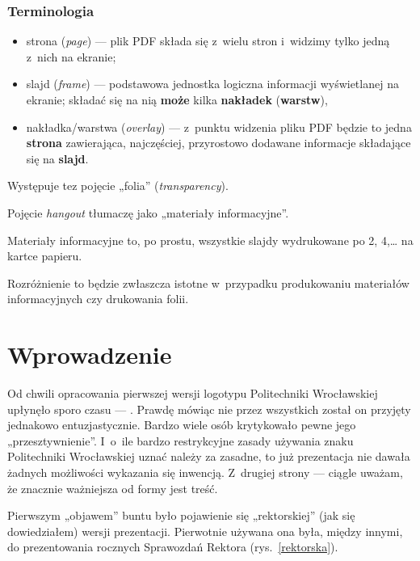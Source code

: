 \begin{frame}[fragile]
 \frametitle<presentation>{Terminologia}
 \begin{itemize}
  \item
        strona (\emph{page}) — plik PDF składa się z~wielu stron i~widzimy tylko jedną z~nich na ekranie;
  \item
        slajd (\emph{frame}) — podstawowa jednostka logiczna informacji wyświetlanej na ekranie; składać się na nią \textbf{może} kilka \textbf{nakładek} (\textbf{warstw}),
  \item
        nakładka/warstwa (\emph{overlay}) — z~punktu widzenia pliku PDF będzie to jedna \textbf{strona} zawierająca, najczęściej, przyrostowo dodawane informacje składające się na \textbf{slajd}.

 \end{itemize}
 Występuje tez pojęcie „folia” (\emph{transparency}).

 Pojęcie \emph{hangout} tłumaczę jako „materiały informacyjne”.
\end{frame}
Materiały informacyjne to, po prostu, wszystkie slajdy wydrukowane po 2, 4,… na kartce papieru.

Rozróżnienie to będzie zwłaszcza istotne w~przypadku produkowaniu materiałów informacyjnych czy drukowania folii.

\section{Wprowadzenie}

Od chwili opracowania pierwszej wersji logotypu Politechniki Wrocławskiej \cite{siw2004} upłynęło sporo czasu — . Prawdę mówiąc nie przez wszystkich został on przyjęty jednakowo entuzjastycznie. Bardzo wiele osób krytykowało pewne jego „przesztywnienie”. I~o~ile bardzo restrykcyjne zasady używania znaku Politechniki  Wrocławskiej uznać należy za zasadne, to już prezentacja nie dawała żadnych możliwości wykazania się inwencją. Z~drugiej strony — ciągle uważam, że znacznie ważniejsza od formy jest treść.

Pierwszym „objawem” buntu było pojawienie się „rektorskiej” (jak się dowiedziałem) wersji prezentacji. Pierwotnie używana ona była, między innymi, do prezentowania rocznych Sprawozdań Rektora (rys.~\ref{rektorska}).

